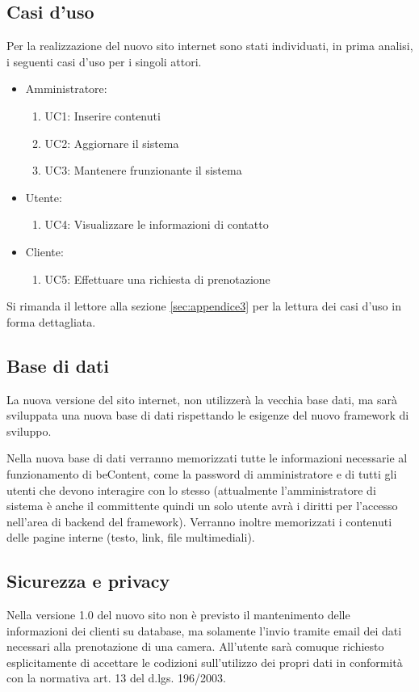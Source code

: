 \documentclass[a4paper,12pt,hidelinks]{report}
\begin{document}
  \subsection{Casi d'uso}
    Per la realizzazione del nuovo sito internet sono stati individuati, in prima analisi, i seguenti casi d'uso per i singoli attori. 
    \begin{itemize}
    \item Amministratore:
      \begin{enumerate}
	\item UC1: Inserire contenuti
	\item UC2: Aggiornare il sistema
	\item UC3: Mantenere frunzionante il sistema
      \end{enumerate}
    \item Utente: 
      \begin{enumerate}
	\item UC4: Visualizzare le informazioni di contatto
      \end{enumerate}
    \item Cliente: 
      \begin{enumerate}
	\item UC5: Effettuare una richiesta di prenotazione
      \end{enumerate}
    \end{itemize}
    Si rimanda il lettore alla sezione \ref{sec:appendice3} per la lettura dei casi d'uso in forma dettagliata.

  \subsection{Base di dati}
    La nuova versione del sito internet, non utilizzerà la vecchia base dati, ma sarà sviluppata una nuova base di dati rispettando le esigenze 
    del nuovo framework di sviluppo.
    \par Nella nuova base di dati verranno memorizzati tutte le informazioni necessarie al funzionamento di beContent, come la password di amministratore 
    e di tutti gli utenti che devono interagire con lo stesso (attualmente l'amministratore di sistema è anche il committente quindi un solo utente avrà 
    i diritti per l'accesso nell'area di backend del framework).
    Verranno inoltre memorizzati i contenuti delle pagine interne (testo, link, file multimediali).

  \subsection{Sicurezza e privacy}
    Nella versione 1.0 del nuovo sito non è previsto il mantenimento delle informazioni dei clienti su database, ma solamente l'invio tramite email dei dati necessari
    alla prenotazione di una camera.
    All'utente sarà comuque richiesto esplicitamente di accettare le codizioni sull'utilizzo dei propri dati in conformità con la normativa art. 13 del d.lgs. 196/2003.
\end{document}
